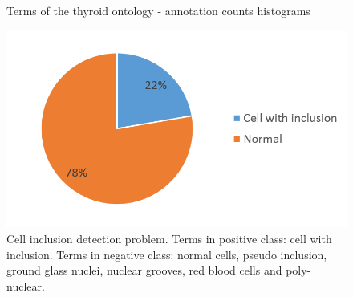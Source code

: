 \begin{figure}
	\caption{Terms of the thyroid ontology - annotation counts histograms}
	\label{fig:ontology_histograms}
\end{figure}

\begin{figure}
	\center
	\includegraphics[scale=0.75]{image/imbalance_binary_problem.png}
	\caption{Cell inclusion detection problem. Terms in positive class: cell with inclusion. Terms in negative class: normal cells, pseudo inclusion, ground glass nuclei, nuclear grooves, red blood cells and poly-nuclear.}
	\label{fig:imbalance_incl_vs_norm}
\end{figure}